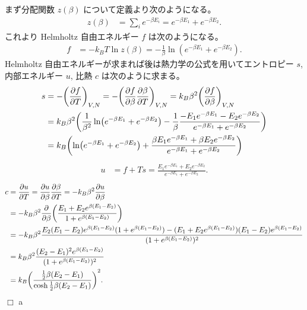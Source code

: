 \documentclass[uplatex,dvipdfmx,a4paper,11pt]{jlreq}
\theoremstyle{definition}
\begin{document}
まず分配関数 $z(\beta)$ について定義より次のようになる。
\begin{align}
  z(\beta) & = \sum_{i} e^{-\beta E_i} = e^{-\beta E_1} + e^{-\beta E_2}.
\end{align}
これより Helmholtz 自由エネルギー $f$ は次のようになる。
\begin{align}
  f & = -k_BT\ln z(\beta) = -\frac{1}{\beta}\ln(e^{-\beta E_1} + e^{-\beta E_2}).
\end{align}
Helmholtz 自由エネルギーが求まれば後は熱力学の公式を用いてエントロピー $s$, 内部エネルギー $u$, 比熱 $c$ は次のように求まる。
\begin{align}
  s & = - \qty(\pdv{f}{T})_{V,N} = - \qty(\pdv{f}{\beta}\pdv{\beta}{T})_{V,N} = k_B\beta^2\qty(\pdv{f}{\beta})_{V,N}                                                          \\
    & = k_B\beta^2\qty(\frac{1}{\beta^2}\ln(e^{-\beta E_1} + e^{-\beta E_2}) - \frac{1}{\beta}\frac{-E_1e^{-\beta E_1} - E_2e^{-\beta E_2}}{e^{-\beta E_1} + e^{-\beta E_2}}) \\
    & = k_B\qty(\ln(e^{-\beta E_1} + e^{-\beta E_2}) + \frac{\beta E_1e^{-\beta E_1} + \beta E_2e^{-\beta E_2}}{e^{-\beta E_1} + e^{-\beta E_2}})
\end{align}
\begin{align}
  u & = f + Ts = \frac{E_1e^{-\beta E_1} + E_2e^{-\beta E_2}}{e^{-\beta E_1} + e^{-\beta E_2}}.
\end{align}
\begin{align}
  c & = \pdv{u}{T} = \pdv{u}{\beta}\pdv{\beta}{T} = -k_B\beta^2\pdv{u}{\beta}                                                                                                         \\
    & = -k_B\beta^2\pdv{\beta}\qty(\frac{E_1 + E_2e^{\beta(E_1 - E_2)}}{1 + e^{\beta(E_1 - E_2)}})                                                                                    \\
    & = -k_B\beta^2\frac{E_2(E_1 - E_2)e^{\beta(E_1 - E_2)}(1 + e^{\beta(E_1 - E_2)}) - (E_1 + E_2e^{\beta(E_1 - E_2)})(E_1 - E_2)e^{\beta(E_1 - E_2)}}{(1 + e^{\beta(E_1 - E_2)})^2} \\
    & = k_B\beta^2\frac{(E_2 - E_1)^2e^{\beta(E_1 - E_2)}}{(1 + e^{\beta(E_1 - E_2)})^2}                                                                                              \\
    & = k_B\qty(\frac{\frac{1}{2}\beta(E_2 - E_1)}{\cosh\frac{1}{2}\beta(E_2 - E_1)})^2.
\end{align}
$\Box$
a
\end{document}

